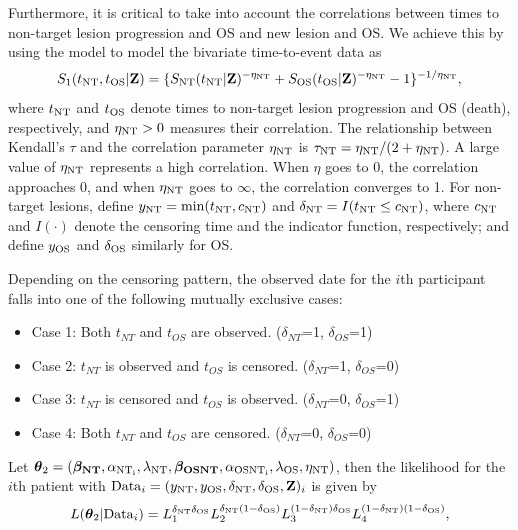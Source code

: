 Furthermore, it is critical to take into account the correlations
between times to non-target lesion progression and \ac{OS} and new lesion and \ac{OS}. We achieve this by using the \cite{clayton1978model} model to model the bivariate time-to-event data as
\begin{equation}
S_1(t_{\rm NT},
t_{\rm OS}|\textbf{Z})=\{S_{\rm NT}(t_{\rm NT}|\textbf{Z})^{-\eta_{\rm NT}}
+S_{\rm OS}(t_{\rm OS}|\textbf{Z})^{-\eta_{\rm NT}}-1\}^{-1/\eta_{\rm NT}}, \label{clayton1}
\end{equation}
where $t_{\rm NT}$ and $t_{\rm OS}$ denote times to non-target lesion progression and \ac{OS} (death),
respectively, and $\eta_{\rm NT}>0$ measures their correlation.
The relationship between Kendall's $\tau$ and the correlation parameter $\eta_{\rm NT}$
is $\tau_{\rm NT} = \eta_{\rm NT}/(2+\eta_{\rm NT})$. A large value of $\eta_{\rm NT}$
represents a high correlation. When $\eta$ goes to 0,
the correlation approaches 0, and when $\eta_{\rm NT}$ goes to $\infty$, the correlation converges to 1.
For non-target lesions,
define $y_{\rm NT}=\mathrm{min}(t_{\rm NT}, c_{\rm NT})$ and
$\delta_{\rm NT}=I(t_{\rm NT} \le c_{\rm NT})$,
where $c_{\rm NT}$ and $I(\cdot)$ denote the censoring time and the indicator function,
respectively; and define $y_{\rm OS}$ and $\delta_{\rm OS}$ similarly for \ac{OS}.

Depending on the censoring pattern, the observed date for the $i$th participant falls into one of the
following mutually exclusive cases:

\begin{itemize}
\item Case 1: Both $t_{NT}$ and $t_{OS}$ are observed. ($\delta_{NT}$=1, $\delta_{OS}$=1)
\item Case 2: $t_{NT}$ is observed and $t_{OS}$ is censored. ($\delta_{NT}$=1, $\delta_{OS}$=0)
\item Case 3: $t_{NT}$ is censored and $t_{OS}$ is observed. ($\delta_{NT}$=0, $\delta_{OS}$=1)
\item Case 4: Both $t_{NT}$ and $t_{OS}$ are censored. ($\delta_{NT}$=0, $\delta_{OS}$=0)

\end{itemize}

Let
$\boldsymbol{\theta}_2=(\boldsymbol{\beta_{\rm NT}}, \alpha_{\rm NT_i}, \lambda_{\rm NT}, \boldsymbol{\beta_{\rm OSNT}},
\alpha_{\rm OSNT_i}, \lambda_{\rm OS}, \eta_{\rm NT})$,  then the
likelihood for the $i$th patient with ${\rm Data}_i=(y_{\rm NT}, y_{\rm OS},
\delta_{\rm NT}, \delta_{\rm OS}, \textbf{Z})_i$ is given by
$$
L(\boldsymbol{\theta}_2|{\rm Data}_i)
=L_1^{\delta_{\rm NT}\delta_{\rm OS}}
L_2^{\delta_{\rm NT}(1-\delta_{\rm OS})}L_3^{(1-\delta_{\rm NT})\delta_{\rm OS}}
L_4^{(1-\delta_{\rm NT})(1-\delta_{\rm OS})}, \label{likelihood1}
$$

